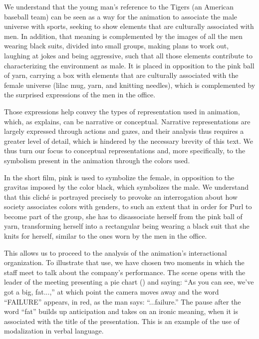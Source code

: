 \documentclass[english]{textolivre}
\begin{document}
We understand that the young man’s reference to the Tigers (an American baseball team) can be seen as a way for the animation to associate the male universe with sports, seeking to show elements that are culturally associated with men. In addition, that meaning is complemented by the images of all the men wearing black suits, divided into small groups, making plans to work out, laughing at jokes and being aggressive, such that all those elements contribute to characterizing the environment as male. It is placed in opposition to the pink ball of yarn, carrying a box with elements that are culturally associated with the female universe (lilac mug, yarn, and knitting needles), which is complemented by the surprised expressions of the men in the office. 

Those expressions help convey the types of representation used in animation, which, as \textcite{leal2011organizaccao} explains, can be narrative or conceptual. Narrative representations are largely expressed through actions and gazes, and their analysis thus requires a greater level of detail, which is hindered by the necessary brevity of this text. We thus turn our focus to conceptual representations and, more specifically, to the symbolism present in the animation through the colors used. 

In the short film, pink is used to symbolize the female, in opposition to the gravitas imposed by the color black, which symbolizes the male. We understand that this cliché is portrayed precisely to provoke an interrogation about how society associates colors with genders, to such an extent that in order for Purl to become part of the group, she has to disassociate herself from the pink ball of yarn, transforming herself into a rectangular being wearing a black suit that she knits for herself, similar to the ones worn by the men in the office. 

This allows us to proceed to the analysis of the animation’s interactional organization. To illustrate that use, we have chosen two moments in which the staff meet to talk about the company’s performance. The scene opens with the leader of the meeting presenting a pie chart () and saying: “As you can see, we’ve got a big, fat...,” at which point the camera moves away and the word “FAILURE” appears, in red, as the man says: “...failure.” The pause after the word “fat” builds up anticipation and takes on an ironic meaning, when it is associated with the title of the presentation. This is an example of the use of modalization in verbal language. 
\end{document}
